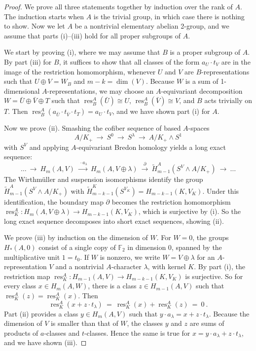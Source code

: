 \documentclass{amsart}[12pt]
\DeclareMathOperator{\res}{res}
\newcommand{\mF}{{\mathbb F}}
\newcommand{\iso}{\cong}
\newcommand{\sm}{\wedge}
\newcommand{\xra}{\xrightarrow}
\renewcommand{\to}{\longrightarrow}
\numberwithin{equation}{section}
\theoremstyle{definition}
\begin{document}
\begin{proof}
  We prove all three statements together by induction over the rank of $A$.
  The induction starts when $A$ is the trivial group, in which case there is nothing to show.
  Now we let $A$ be a nontrivial elementary abelian 2-group, and we assume
  that parts (i)--(iii) hold for all proper subgroups of $A$.

  We start by proving (i), where we may assume that $B$ is a proper subgroup of $A$.
  By part (iii) for $B$, it suffices to show that all classes of the form
  $a_U\cdot t_V$ are in the image of the restriction homomorphism,
  whenever $U$ and $V$ are $B$-representations such that $U\oplus V=W_B$
  and $m-k=\dim(V)$. Because $W$ is a sum of 1-dimensional $A$-representations,
  we may choose an $A$-equivariant decomposition $W=\bar U\oplus\bar V\oplus T$
  such that  $\res^A_B(\bar U)\iso U$, $\res^A_B(\bar V)\iso V$,
  and $B$ acts trivially on $T$.
  Then $\res^A_B(a_{\bar U}\cdot t_{\bar V}\cdot t_T)= a_U\cdot t_V$,
  and we have shown part (i) for $A$.

  Now we prove (ii).
  Smashing the cofiber sequence of based $A$-spaces
  \[ A/K_+ \ \xra{\quad} \ S^0 \ \xra{\quad }\ S^\lambda \ \to\ A/K_+\sm S^1 \]
  with $S^V$ and applying $A$-equivariant Bredon homology yields a long exact sequence: 
  \[ 
       \dots\ \to \  H_m(A,V) \  \xra{\ \cdot a_\lambda}\ H_m(A,V\oplus\lambda)\
     \xra{\ \partial\ }\  \tilde H_{m-1}^A(S^V\sm A/K_+)\ \to\  \dots  
 \]
  The Wirthm{\"u}ller and suspension isomorphisms identify the group $\tilde H_{m-1}^A(S^V\sm A/K_+)$
  with $\tilde H_{m-k-1}^K(S^{V_K})=H_{m-k-1}(K,V_K)$.
  Under this identification, the boundary map $\partial$ becomes the
  restriction homomorphism $\res^A_K:H_m(A,V\oplus\lambda)\to H_{m-k-1}(K,V_K)$,
  which is surjective by (i).
  So the long exact sequence decomposes into short exact sequences, showing (ii).

  We prove (iii) by induction on the dimension of $W$.
  For $W=0$, the groups $H_*(A,0)$ consist of a single copy of $\mF_2$
  in dimension 0, spanned by the multiplicative unit $1=t_0$.
  If $W$ is nonzero, we write $W=V\oplus\lambda$
  for an $A$-representation $V$ and a nontrivial $A$-character $\lambda$, with kernel $K$.
  By part (i), the restriction map  $\res^A_K : H_{m-1}(A,V)\to  H_{m-k-1}(K,V_K)$ is surjective.
  So for every class $x\in H_m(A,W)$,
  there is a class $z\in H_{m-1}(A,V)$ such that $\res^A_K(z)=\res^A_K(x)$. Then
  \[ \res^A_K(x + z\cdot t_\lambda)\ = \ \res^A_K(x) + \res^A_K(z)\ = \ 0 \ .\]
  Part (ii) provides a class $y\in H_m(A,V)$ such that  $y\cdot a_\lambda= x + z\cdot t_\lambda$.
  Because the dimension of $V$ is smaller than that of $W$,
  the classes $y$ and $z$ are sums of products of $a$-classes and $t$-classes.
  Hence the same is true for $x=y\cdot a_\lambda+ z\cdot t_\lambda$,
  and we have shown (iii). 
\end{proof}
\end{document}
